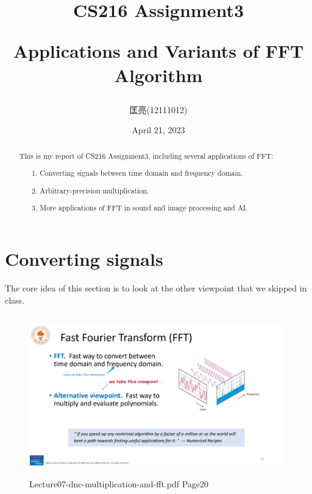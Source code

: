 \documentclass{article}
\title{CS216 Assignment3 \\ {\begin{large} Applications and Variants of FFT Algorithm \end{large}}}
\author{匡亮(12111012)}
\date{April 21, 2023}
\begin{document}
\maketitle

\renewcommand\abstractname{Abstract}
\begin{abstract}

This is my report of CS216 Assignment3, including several applications of FFT:

\begin{itemize}
    \item [1.] Converting signals between time domain and frequency domain.
    \item [2.] Arbitrary-precision multiplication.
    \item [3.] More applications of FFT in sound and image processing and AI.
\end{itemize}

\end{abstract}

\newpage %

\renewcommand\contentsname{Contents}
\tableofcontents

\newpage  %

\section{Converting signals}

The core idea of this section is to look at the other viewpoint that we skipped in class.

\begin{figure}[h]  %
    \centering
    \includegraphics[height=7cm,width=11cm]{figure/1.png}
    \caption{Lecture07-dnc-multiplication-and-fft.pdf Page20}
    \label{1}
\end{figure}
\end{document}
